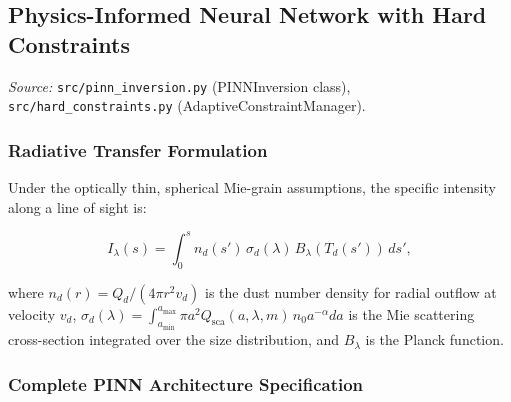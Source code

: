 \documentclass[usenatbib]{mnras}
\begin{document}
\subsection{Physics-Informed Neural Network with Hard Constraints}\label{sec:pinn}

\textit{Source:} \texttt{src/pinn\_inversion.py} (PINNInversion class), \texttt{src/hard\_constraints.py} (AdaptiveConstraintManager).

\subsubsection{Radiative Transfer Formulation}

Under the optically thin, spherical Mie-grain assumptions, the specific intensity along a line of sight is:

\begin{equation}\label{eq:thin_dust}
I_\lambda(s) = \int_{0}^{s} n_d(s') \, \sigma_d(\lambda) \, B_\lambda(T_d(s')) \, ds',
\end{equation}

where $n_d(r) = Q_d / (4\pi r^2 v_d)$ is the dust number density for radial outflow at velocity $v_d$, $\sigma_d(\lambda) = \int_{a_{\min}}^{a_{\max}} \pi a^2 Q_{\text{sca}}(a,\lambda,m) \, n_0 a^{-\alpha} da$ is the Mie scattering cross-section integrated over the size distribution, and $B_\lambda$ is the Planck function.

\subsubsection{Complete PINN Architecture Specification}\label{sec:arch}
\end{document}
